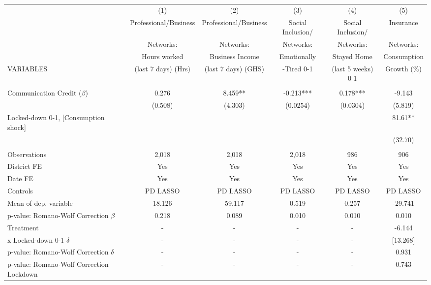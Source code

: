\begin{tabular}{lccccc} \hline
 & (1) & (2) & (3) & (4) & (5) \\
 & Professional/Business & Professional/Business & Social Inclusion/ & Social Inclusion/ & Insurance \\
 & Networks: & Networks: & Networks: & Networks: & Networks: \\
 & Hours worked & Business Income & Emotionally & Stayed Home & Consumption \\
VARIABLES & (last 7 days) (Hrs) & (last 7 days) (GHS) & -Tired 0-1 & (last 5 weeks) 0-1 & Growth (\%) \\ \hline
 &  &  &  &  &  \\
Communication Credit ($\beta$) & 0.276 & 8.459** & -0.213*** & 0.178*** & -9.143 \\
 & (0.508) & (4.303) & (0.0254) & (0.0304) & (5.819) \\
Locked-down 0-1, [Consumption shock] &  &  &  &  & 81.61** \\
 &  &  &  &  & (32.70) \\
 &  &  &  &  &  \\
Observations & 2,018 & 2,018 & 2,018 & 986 & 906 \\
District FE & Yes & Yes & Yes & Yes & Yes \\
Date FE & Yes & Yes & Yes & Yes & Yes \\
Controls & PD LASSO & PD LASSO & PD LASSO & PD LASSO & PD LASSO \\
Mean of dep. variable & 18.126 & 59.117 & 0.519 & 0.257 & -29.741 \\
p-value: Romano-Wolf Correction $\beta$ & 0.218 & 0.089 & 0.010 & 0.010 & 0.010 \\
Treatment & - & - & - & - & -6.144 \\
\hspace{0.5cm} x Locked-down 0-1 $\delta$ & - & - & - & - & [13.268] \\
p-value: Romano-Wolf Correction $\delta$ & - & - & - & - & 0.931 \\
 p-value: Romano-Wolf Correction Lockdown & - & - & - & - & 0.743 \\ \hline
\end{tabular}

